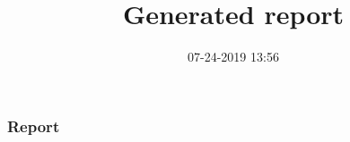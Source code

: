 \documentclass[slidestop]{beamer}
\numberwithin{equation}{section}
\begin{document}

\part{ }


\title[CIRL Generated Report]{Generated report}

\author{}

\institute{}

\date{07-24-2019 13:56}

\frame{\titlepage}

\section{Report}
\end{document}
